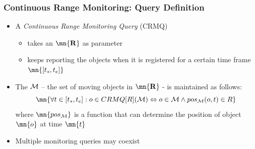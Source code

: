 
\begin{frame}
\frametitle{Continuous Range Monitoring: Query Definition}

\begin{itemize}
  \item A \emph{Continuous Range Monitoring Query} (CRMQ)
    \begin{itemize}
      \item takes an  $\bf \mn{R}$ as parameter
      \item keeps reporting the objects when it is registered for a certain time frame $\mn{[t_s, t_e]}$
    \end{itemize}
  \item The  $\bf \mathcal{M}$ -- the set of moving objects in $\bf \mn{R}$ - is maintained as follows:
    \begin{equation*}
      \mn{
      \forall t \in [t_s, t_e]: o \in CRMQ[R](\mathcal{M})  \Leftrightarrow o \in \mathcal{M} \wedge pos_{\mathcal{M}}(o, t) \in R
      }
    \end{equation*}
    where $\mn{pos_\mathcal{M}}$ is a function that can determine the position of object $\mn{o}$ at time $\mn{t}$
  \item Multiple monitoring queries may coexist
\end{itemize}

\end{frame}


